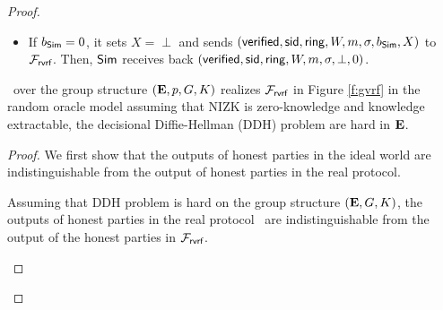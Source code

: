 \begin{proof}
\begin{itemize}
\begin{itemize}
\begin{itemize}
			\end{itemize}
			\item If $ b_{\mathsf{Sim}} = 0 $, it sets $ X = \perp $ and sends  $ (\mathsf{verified}, \textsf{sid}, \mathsf{ring}, W, m, \sigma, b_{\mathsf{Sim}}, X) $ to $ \mathcal{F}_{\textsf{rvrf}} $. Then, $ \mathsf{Sim} $ receives back $ (\mathsf{verified}, \textsf{sid}, \mathsf{ring}, W, m, \sigma, \perp, 0) $. 
			
		\end{itemize}
		
		
		
		
		
		
	\end{itemize}
	
	\begin{theorem}\label{thm:rvrf}
		\name \ over the group structure $ ({\mathbf{E}},p,G,K) $ realizes $ \mathcal{F}_{\textsf{rvrf}} $ in Figure \ref{f:gvrf} in the random oracle model assuming that NIZK is zero-knowledge and knowledge extractable, the decisional Diffie-Hellman (DDH) problem are hard in $ {\mathbf{E}}  $. 
	\end{theorem}
	
	\begin{proof}
		
		We first show that the outputs of honest parties in the ideal world are indistinguishable from the output of honest parties in the real protocol. 
		
		\begin{lemma}\label{lem:honestoutput}
			Assuming that DDH problem is hard on the group structure $ ({\mathbf{E}}, G,K) $, the outputs of honest parties in the real protocol \name\ are indistinguishable from the output of the honest parties in $ \mathcal{F}_{\textsf{rvrf}} $.
		\end{lemma}
		

\end{proof}
\end{proof}
